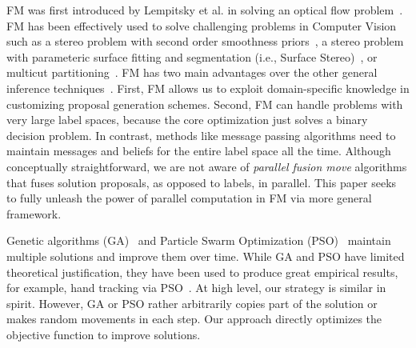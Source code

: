 \noindent FM was first introduced by Lempitsky et al. in solving an
optical flow problem~\cite{first_fusion_viktor}. FM has been effectively
used to solve challenging problems in Computer Vision such as a stereo
problem with second order smoothness priors~\cite{woodford}, a stereo
problem with parameteric surface fitting and segmentation (i.e., Surface
Stereo)~\cite{surface_stereo}, or multicut
partitioning~\cite{fusionmovesforcorrelationclustering}.
%
FM has two main advantages over the other general inference
techniques~\cite{trw,loopy_belief_propagation}.  First, FM allows us to exploit
domain-specific knowledge in customizing proposal generation
schemes. Second, FM can handle problems with very large label spaces,
because the core optimization just solves a binary decision problem. In
contrast, methods like message passing algorithms need to maintain
messages and beliefs for the entire label space all the time. 
%
Although conceptually straightforward, we are not aware of {\it parallel
fusion move} algorithms that fuses solution proposals, as opposed to
labels, in parallel. This paper seeks to fully unleash the power of
parallel computation in FM via more general framework.



\noindent
Genetic algorithms (GA)~\cite{ga} and Particle Swarm
Optimization (PSO)~\cite{pso} maintain multiple solutions and improve
them over time.
%
While GA and PSO have limited theoretical justification, they have been
used to produce great empirical results, for example, hand tracking via
PSO~\cite{pushmeet_hand_tracking}. At high level, our strategy is
similar in spirit. However, GA or PSO rather arbitrarily copies part of
the solution or makes random movements in each step. Our approach
directly optimizes the objective function to improve solutions.


